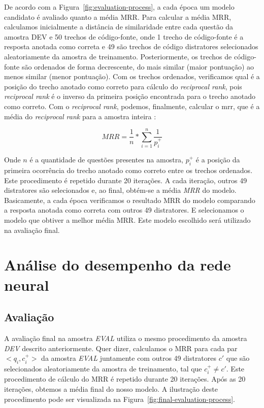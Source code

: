 De acordo com a Figura~\ref{fig:evaluation-process}, a cada época um modelo candidato é avaliado quanto a média MRR. Para calcular a média MRR, calculamos inicialmente a distância de similaridade entre cada questão da amostra DEV e 50 trechos de código-fonte, onde 1 trecho de código-fonte é a resposta anotada como correta e 49 são trechos de código distratores selecionados aleatoriamente da amostra de treinamento.  Posteriormente, os trechos de código-fonte são ordenados de forma decrescente, do mais similar (maior pontuação) ao menos similar (menor pontuação). Com os trechos ordenados, verificamos qual é a posição do trecho anotado como correto para cálculo do \textit{reciprocal rank}, pois \textit{reciprocal rank} é o inverso da primeira posição encontrada para o trecho anotado como correto. Com o \textit{reciprocal rank}, podemos, finalmente, calcular o \acrshort{mrr}, que é a média do \textit{reciprocal rank} para a amostra inteira \citep{Gu-deep-code-search:2018}:

\begin{equation}\label{eq:mrr}
MRR = \frac{1}{n} * \sum_{i = 1}^{n}\frac{1}{p_{i}^{+}}    
\end{equation}

Onde $n$ é a quantidade de questões presentes na amostra, $p_{i}^{+}$ é a posição da primeira ocorrência do trecho anotado como correto entre os trechos ordenados. Este procedimento é repetido durante 20 iterações. A cada iteração, outros 49 distratores são selecionados e, ao final, obtém-se a média \emph{MRR} do modelo. Basicamente, a cada época verificamos o resultado MRR do modelo comparando a resposta anotada como correta com outros 49 distratores. E selecionamos o modelo que obtiver a melhor média MRR. Este modelo escolhido será utilizado na avaliação final.





\section{Análise do desempenho da rede neural}
\label{sec:analise-do-desempenho-da-rede-neural}

\subsection{Avaliação}
\label{sec:avaliacao}

A avaliação final na amostra \emph{EVAL} utiliza o mesmo procedimento da amostra \emph{DEV} descrito anteriormente. Quer dizer, calculamos o MRR para cada par $<q_{i}, c_{i}^{+}>$ da amostra \emph{EVAL} juntamente com outros 49 distratores $c'$ que são selecionados aleatoriamente da amostra de treinamento, tal que $c_{i}^{+} \neq c'$. Este procedimento de cálculo do MRR é repetido durante 20 iterações. Após as 20 iterações, obtemos a média final do nosso modelo. A ilustração deste procedimento pode ser visualizada na Figura~\ref{fig:final-evaluation-process}.

